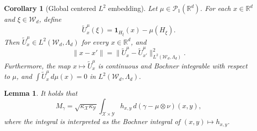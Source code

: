 \documentclass[10pt,a4paper]{amsart}
\newtheorem{lemma}{Lemma}
\newtheorem{corollary}{Corollary}
\newcommand{\R}{\mathbb{R}}
\newcommand{\one}{\mathbf{1}}
\begin{document}
\begin{corollary}[Global centered $L^2$ embedding]
\label{cor:global-crofton-centered}
Let $\mu\in\mathcal P_1(\R^d)$. For each $x\in \R^{d}$ and $\xi \in \mathcal{W}_d$, define
\begin{equation}\label{eq:global-centered-crofton}
\widetilde U_x^\mu(\xi)
=
\one_{H_\xi}(x)-\mu(H_\xi).
\end{equation}
Then $\widetilde U_x^\mu\in L^2(\mathcal W_d,\Lambda_d)$ for every
$x\in\R^d$, and 
\begin{equation}\label{eq:global-centeredl2embedding}
\|x-x'\|
=
\|\widetilde U_x^\mu-\widetilde U_{x'}^\mu\|^2_{L^2(\mathcal{W}_d, \Lambda_d)}.
\end{equation}
Furthermore, the map $x\mapsto \widetilde U_x^\mu$ is continuous and Bochner
integrable with respect to $\mu$, and
$\int \widetilde U_x^\mu\,d\mu(x)=0$ in $L^2(\mathcal{W}_d, \Lambda_d)$.
\end{corollary}

\begin{lemma}\label{lem:Mgamma representation}
It holds that
\begin{equation}\label{eq:pointwise}
M_\gamma
=
\sqrt{\kappa_{\mathcal X}\kappa_{\mathcal Y}}
\int_{\mathcal X\times\mathcal Y}
h_{x,y}\,d(\gamma-\mu\otimes\nu)(x,y),
\end{equation}
where the integral is interpreted as the Bochner integral of
$(x,y)\mapsto h_{x,y}$.
\end{lemma}
\end{document}
